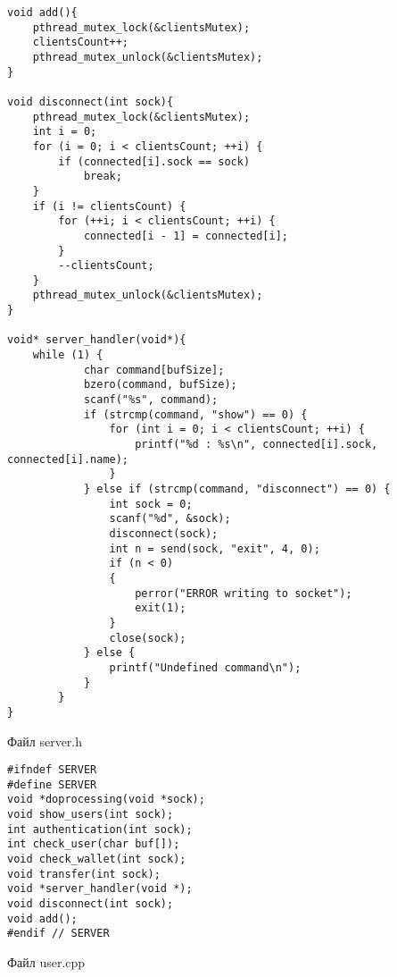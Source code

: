 \documentclass[12pt,a4paper]{report}
\begin{document}
\begin{lstlisting}
void add(){
    pthread_mutex_lock(&clientsMutex);
    clientsCount++;
    pthread_mutex_unlock(&clientsMutex);
}

void disconnect(int sock){
    pthread_mutex_lock(&clientsMutex);
    int i = 0;
    for (i = 0; i < clientsCount; ++i) {
        if (connected[i].sock == sock)
            break;
    }
    if (i != clientsCount) {
        for (++i; i < clientsCount; ++i) {
            connected[i - 1] = connected[i];
        }
        --clientsCount;
    }
    pthread_mutex_unlock(&clientsMutex);
}

void* server_handler(void*){
    while (1) {
            char command[bufSize];
            bzero(command, bufSize);
            scanf("%s", command);
            if (strcmp(command, "show") == 0) {
                for (int i = 0; i < clientsCount; ++i) {
                    printf("%d : %s\n", connected[i].sock, connected[i].name);
                }
            } else if (strcmp(command, "disconnect") == 0) {
                int sock = 0;
                scanf("%d", &sock);
                disconnect(sock);
                int n = send(sock, "exit", 4, 0);
                if (n < 0)
                {
                    perror("ERROR writing to socket");
                    exit(1);
                }
                close(sock);
            } else {
                printf("Undefined command\n");
            }
        }
}
\end{lstlisting}
Файл server.h
\begin{lstlisting}
#ifndef SERVER
#define SERVER
void *doprocessing(void *sock);
void show_users(int sock);
int authentication(int sock);
int check_user(char buf[]);
void check_wallet(int sock);
void transfer(int sock);
void *server_handler(void *);
void disconnect(int sock);
void add();
#endif // SERVER
\end{lstlisting}
Файл user.cpp
\end{document}

